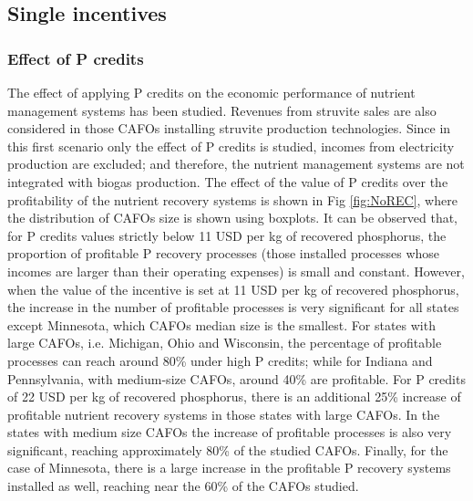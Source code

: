 \begin{refsection}[referencesCh5]
\subsection{Single incentives}
\subsubsection{Effect of P credits}
The effect of applying P credits on the economic performance of nutrient management systems has been studied. Revenues from struvite sales are also considered in those CAFOs installing struvite production technologies. Since in this first scenario only the effect of P credits is studied, incomes from electricity production are excluded; and therefore, the nutrient management systems are not integrated with biogas production. The effect of the value of P credits over the profitability of the nutrient recovery systems is shown in Fig \ref{fig:NoREC}, where the distribution of CAFOs size is shown using boxplots. It can be observed that, for P credits values strictly below 11 USD per kg of recovered phosphorus, the proportion of profitable P recovery processes (those installed processes whose incomes are larger than their operating expenses) is small and constant. However, when the value of the incentive is set at 11 USD per kg of recovered phosphorus, the increase in the number of profitable processes is very significant for all states except Minnesota, which CAFOs median size is the smallest. For states with large CAFOs, i.e. Michigan, Ohio and Wisconsin, the percentage of profitable processes can reach around 80\% under high P credits; while for Indiana and Pennsylvania, with medium-size CAFOs, around 40\% are profitable. For P credits of 22 USD per kg of recovered phosphorus, there is an additional 25\% increase of profitable nutrient recovery systems in those states with large CAFOs. In the states with medium size CAFOs the increase of profitable processes is also very significant, reaching approximately 80\% of the studied CAFOs. Finally, for the case of Minnesota, there is a large increase in the profitable P recovery systems installed as well, reaching near the 60\% of the CAFOs studied.


\end{refsection}
